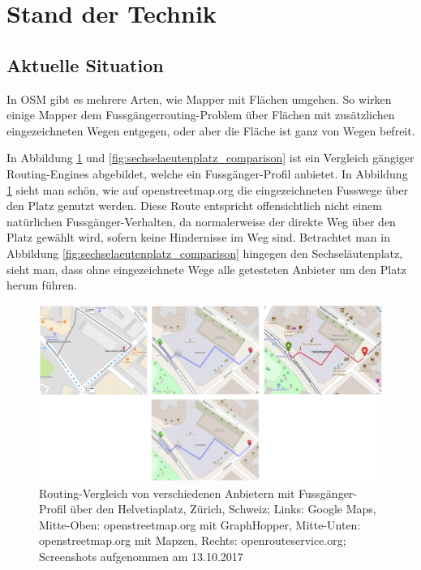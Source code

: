 \section{Stand der Technik}
\label{sec:Stand der Technik}

\subsection{Aktuelle Situation}
\label{sub:Aktuelle Situation}

In \ac{OSM} gibt es mehrere Arten, wie Mapper mit Flächen umgehen. So wirken einige Mapper dem Fussgängerrouting-Problem über Flächen mit zusätzlichen eingezeichneten Wegen entgegen, oder aber die Fläche ist ganz von Wegen befreit.

In Abbildung \ref{fig:helvetiaplatz_comparison} und \ref{fig:sechselaeutenplatz_comparison} ist ein Vergleich gängiger Routing-Engines abgebildet, welche ein Fussgänger-Profil anbietet. In Abbildung \ref{fig:helvetiaplatz_comparison} sieht man schön, wie auf openstreetmap.org die eingezeichneten Fusswege über den Platz genutzt werden. Diese Route entspricht offensichtlich nicht einem natürlichen Fussgänger-Verhalten, da normalerweise der direkte Weg über den Platz gewählt wird, sofern keine Hindernisse im Weg sind. Betrachtet man in Abbildung \ref{fig:sechselaeutenplatz_comparison} hingegen den Sechseläutenplatz, sieht man, dass ohne eingezeichnete Wege alle getesteten Anbieter um den Platz herum führen.

\begin{figure}[ht]
\centering
\includegraphics[width=1\linewidth]{technicalreport/img/helvetiaplatz_comparison}
\caption[Fussgänger-Routing Vergleich]{Routing-Vergleich von verschiedenen Anbietern mit Fussgänger-Profil über den Helvetiaplatz, Zürich, Schweiz; Links: Google Maps, Mitte-Oben: openstreetmap.org mit GraphHopper, Mitte-Unten: openstreetmap.org mit Mapzen, Rechts: openrouteservice.org; Screenshots aufgenommen am 13.10.2017}
\label{fig:helvetiaplatz_comparison}
\end{figure}

